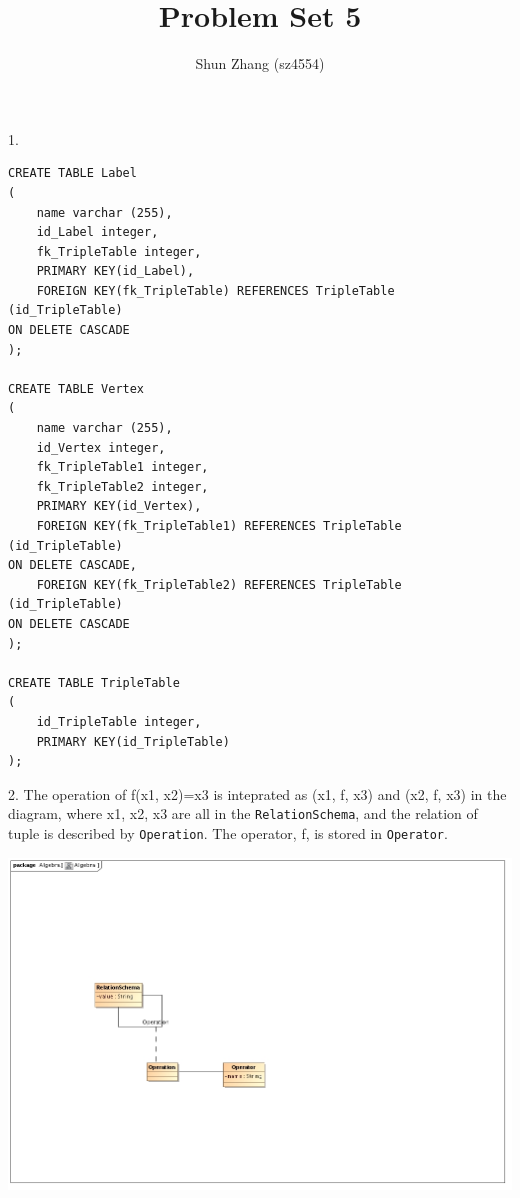 \documentclass[12pt]{article}
\title{Problem Set 5}
\author{Shun Zhang (sz4554)}
\begin{document}
\maketitle

1.

\begin{verbatim}
CREATE TABLE Label
(
	name varchar (255),
	id_Label integer,
	fk_TripleTable integer,
	PRIMARY KEY(id_Label),
	FOREIGN KEY(fk_TripleTable) REFERENCES TripleTable (id_TripleTable)
ON DELETE CASCADE
);
		
CREATE TABLE Vertex
(
	name varchar (255),
	id_Vertex integer,
	fk_TripleTable1 integer,
	fk_TripleTable2 integer,
	PRIMARY KEY(id_Vertex),
	FOREIGN KEY(fk_TripleTable1) REFERENCES TripleTable (id_TripleTable)
ON DELETE CASCADE,
	FOREIGN KEY(fk_TripleTable2) REFERENCES TripleTable (id_TripleTable)
ON DELETE CASCADE
);	
	
CREATE TABLE TripleTable
(
	id_TripleTable integer,
	PRIMARY KEY(id_TripleTable)
);
\end{verbatim}

2. The operation of f(x1, x2)=x3 is inteprated as (x1, f, x3) and (x2, f, x3) in the diagram, where x1, x2, x3 are all in the \texttt{RelationSchema}, and the relation of tuple is described by \texttt{Operation}. The operator, f, is stored in \texttt{Operator}.

\includegraphics[width=220mm]{Algebra.jpg}
\end{document}
